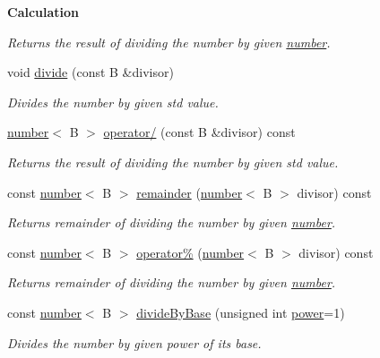 \begin{Indent}{\bf Calculation}
\begin{DoxyCompactItemize}
\begin{DoxyCompactList}\small\item\em Returns the result of dividing the number by given \hyperlink{classcjr_1_1number}{number}. \end{DoxyCompactList}\item 
void \hyperlink{classcjr_1_1number_ae5647dac42c1e31d6c9a906be9e5a0a6}{divide} (const B \&divisor)
\begin{DoxyCompactList}\small\item\em Divides the number by given std value. \end{DoxyCompactList}\item 
\hypertarget{classcjr_1_1number_a77b8020d0a42ef040b68e31e37245af0}{\hyperlink{classcjr_1_1number}{number}$<$ B $>$ \hyperlink{classcjr_1_1number_a77b8020d0a42ef040b68e31e37245af0}{operator/} (const B \&divisor) const }\label{classcjr_1_1number_a77b8020d0a42ef040b68e31e37245af0}

\begin{DoxyCompactList}\small\item\em Returns the result of dividing the number by given std value. \end{DoxyCompactList}\item 
\hypertarget{classcjr_1_1number_a78f188be1582f5307dc6752a6e762887}{const \hyperlink{classcjr_1_1number}{number}$<$ B $>$ \hyperlink{classcjr_1_1number_a78f188be1582f5307dc6752a6e762887}{remainder} (\hyperlink{classcjr_1_1number}{number}$<$ B $>$ divisor) const }\label{classcjr_1_1number_a78f188be1582f5307dc6752a6e762887}

\begin{DoxyCompactList}\small\item\em Returns remainder of dividing the number by given \hyperlink{classcjr_1_1number}{number}. \end{DoxyCompactList}\item 
\hypertarget{classcjr_1_1number_a9aa6a071c98f597336cc587be7b88fda}{const \hyperlink{classcjr_1_1number}{number}$<$ B $>$ \hyperlink{classcjr_1_1number_a9aa6a071c98f597336cc587be7b88fda}{operator\%} (\hyperlink{classcjr_1_1number}{number}$<$ B $>$ divisor) const }\label{classcjr_1_1number_a9aa6a071c98f597336cc587be7b88fda}

\begin{DoxyCompactList}\small\item\em Returns remainder of dividing the number by given \hyperlink{classcjr_1_1number}{number}. \end{DoxyCompactList}\item 
const \hyperlink{classcjr_1_1number}{number}$<$ B $>$ \hyperlink{classcjr_1_1number_ad90db090de7ae9123bbeebd2e136aac9}{divide\-By\-Base} (unsigned int \hyperlink{classcjr_1_1number_ace65049054fa8b2a7498a3f2af7b7298}{power}=1)
\begin{DoxyCompactList}\small\item\em Divides the number by given power of its base. \end{DoxyCompactList}\end{DoxyCompactItemize}
\end{Indent}
